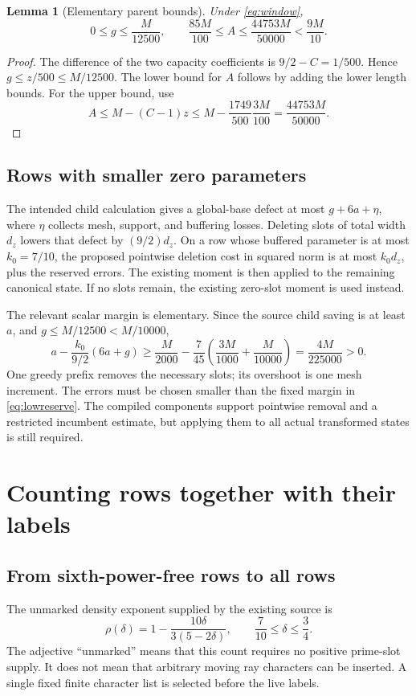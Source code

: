 \documentclass[11pt]{article}
\newtheorem{lemma}[proposition]{Lemma}
\theoremstyle{definition}
\begin{document}
\begin{lemma}[Elementary parent bounds]\label{lem:parent}
Under \eqref{eq:window},
\[
 0\le g\le\frac M{12500},\qquad
 \frac{85M}{100}\le A\le\frac{44753M}{50000}<\frac{9M}{10}.
\]
\end{lemma}
\begin{proof}
The difference of the two capacity coefficients is
$9/2-C=1/500$. Hence $g\le z/500\le M/12500$.
The lower bound for $A$ follows by adding the lower length bounds.
For the upper bound, use
\[
 A\le M-(C-1)z
 \le M-\frac{1749}{500}\frac{3M}{100}
 =\frac{44753M}{50000}.
\]
\end{proof}

\subsection{Rows with smaller zero parameters}
The intended child calculation gives a global-base defect at most
$g+6a+\eta$, where $\eta$ collects mesh, support, and buffering losses.
Deleting slots of total width $d_z$ lowers that defect by $(9/2)d_z$.
On a row whose buffered parameter is at most $k_0=7/10$, the proposed
pointwise deletion cost in squared norm is at most $k_0d_z$, plus the
reserved errors. The existing moment is then applied to the remaining
canonical state. If no slots remain, the existing zero-slot moment is
used instead.

The relevant scalar margin is elementary. Since the source child saving
is at least $a$, and $g\le M/12500<M/10000$,
\begin{equation}\label{eq:lowreserve}
 a-\frac{k_0}{9/2}(6a+g)
 \ge\frac M{2000}-\frac7{45}
       \left(\frac{3M}{1000}+\frac M{10000}\right)
 =\frac{4M}{225000}>0.
\end{equation}
One greedy prefix removes the necessary slots; its overshoot is one
mesh increment. The errors must be chosen smaller than the fixed margin
in \eqref{eq:lowreserve}. The compiled components support pointwise
removal and a restricted incumbent estimate, but applying them to all
actual transformed states is still required.

\section{Counting rows together with their labels}\label{sec:high}

\subsection{From sixth-power-free rows to all rows}
The unmarked density exponent supplied by the existing source is
\begin{equation}\label{eq:rho}
 \rho(\delta)=1-\frac{10\delta}{3(5-2\delta)},
 \qquad \frac7{10}\le\delta\le\frac34.
\end{equation}
The adjective ``unmarked'' means that this count requires no positive
prime-slot supply. It does not mean that arbitrary moving ray characters
can be inserted. A single fixed finite character list is selected before
the live labels.
\end{document}
